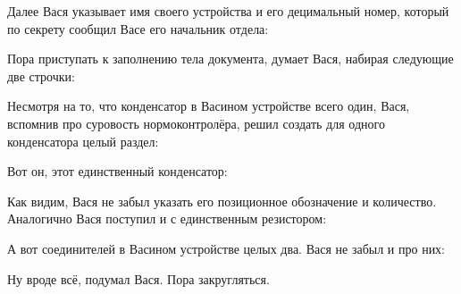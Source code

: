 Далее Вася указывает имя своего устройства и его децимальный номер, который
по секрету сообщил Васе его начальник отдела:


Пора приступать к заполнению тела документа, думает Вася, набирая следующие
две строчки:


Несмотря на то, что конденсатор в Васином устройстве всего один, Вася, вспомнив
про суровость нормоконтролёра,  решил создать для одного конденсатора целый
раздел:


Вот он, этот единственный конденсатор:


Как видим, Вася не забыл указать его позиционное обозначение и
количество. Аналогично Вася поступил и с единственным резистором:


А вот соединителей в Васином устройстве целых два. Вася не забыл и про них:


Ну вроде всё, подумал Вася. Пора закругляться.

